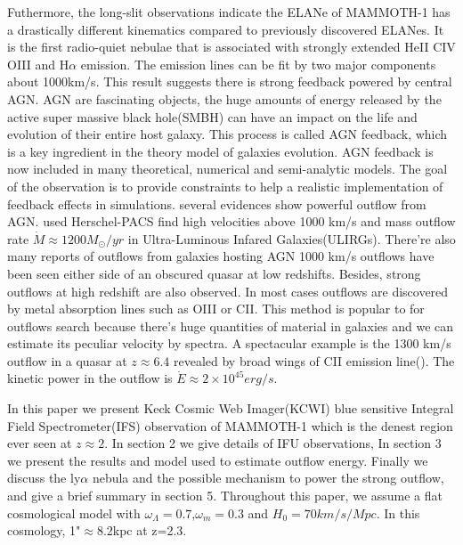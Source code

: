 \documentclass[../main.tex]{subfiles}
\begin{document}
Futhermore, the long-slit observations indicate the ELANe of MAMMOTH-1 has a drastically different kinematics compared to previously discovered ELANes. It is the first radio-quiet nebulae that is associated with strongly extended HeII CIV OIII and H$\alpha$ emission. The emission lines can be fit by two major components about 1000km/s. This result suggests there is strong feedback powered by central AGN. AGN are fascinating objects, the huge amounts of energy released by the active super massive black hole(SMBH) can have an impact on the life and evolution of their entire host galaxy. This process is called AGN feedback, which is a key ingredient in the theory model of galaxies evolution. AGN feedback is now included in many theoretical, numerical and semi-analytic models. The goal of the observation is to provide constraints to help a realistic implementation of feedback effects in simulations. several evidences show powerful outflow from AGN. \cite{sturm2011massive} used Herschel-PACS find high velocities above 1000 km/s and mass outflow rate $\dot{M} \approx 1200 M_{\odot} /yr$ in Ultra-Luminous Infared Galaxies(ULIRGs). There're also many reports of outflows from galaxies hosting AGN 1000 km/s outflows have been seen either side of an obscured quasar at low redshifts. Besides, strong outflows at high redshift are also observed. In most cases outflows are discovered by metal absorption lines such as OIII or CII. This method is popular to for outflows search because there's huge quantities of material in galaxies and we can estimate its peculiar velocity by spectra. A spectacular example is the 1300 km/s outflow in a quasar at $z \approx 6.4$ revealed by broad wings of CII emission line(\cite{cicone2015very}). The kinetic power in the outflow is $\dot{E} \approx 2 \times 10^{45} erg/s$. 

In this paper we present Keck Cosmic Web Imager(KCWI) blue sensitive Integral Field Spectrometer(IFS) observation of MAMMOTH-1 which is the denest region ever seen at $z \approx 2$. In section 2 we give details of IFU observations, In section 3 we present the results and model used to estimate outflow energy. Finally we discuss the ly$\alpha$ nebula and the possible mechanism to power the strong outflow, and give a brief summary in section 5. Throughout this paper, we assume a flat cosmological model with $\omega_{\Lambda}=0.7$,$\omega_{m}=0.3$ and $H_{0}=70 km/s/Mpc$. In this cosmology, 1"$ \approx 8.2$kpc at z=2.3.
\end{document}
